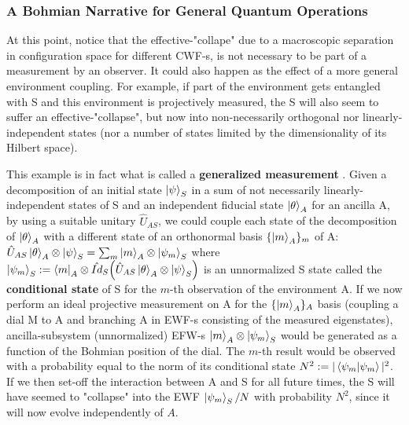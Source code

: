 \documentclass[11pt, a4paper]{article} %
\begin{document}
\subsubsection*{A Bohmian Narrative for General Quantum Operations}
At this point, notice that the effective-"collape" due to a macroscopic separation in configuration space for different CWF-s, is not necessary to be part of a measurement by an observer. It could also happen as the effect of a more general environment coupling. 
For example, if part of the environment gets entangled with S and this environment is projectively measured, the S will also seem to suffer an effective-"collapse", but now into non-necessarily orthogonal nor linearly-independent states (nor a number of states limited by the dimensionality of its Hilbert space). 

This example is in fact what is called a {\bf generalized measurement} \cite{Generalized, Durr}. Given a decomposition of an initial state $\ket{\psi}_S$ in a sum of not necessarily linearly-independent states of S and an independent fiducial state $\ket{\theta}_A$ for an ancilla A, by using a suitable unitary $\hat{U}_{AS}$, we could couple each state of the decomposition of $\ket{\theta}_A$ with a different state of an orthonormal basis $\{\ket{m}_A\}_m$ of A: $\hat{U}_{AS}\ket{\theta}_A\otimes\ket{\psi}_S=\sum_m \ket{m}_A\otimes \ket{\psi_m}_S$ where $\ket{\psi_m}_S:=\bra{m}_A\otimes\hat{Id}_S \qty(\hat{U}_{AS}\ket{\theta}_A\otimes\ket{\psi}_S)$ is an unnormalized S state called the {\bf conditional state} of S for the $m$-th observation of the environment A. If we now perform an ideal projective measurement on A for the $\{\ket{m}_A\}_A$ basis (coupling a dial M to A and branching A in EWF-s consisting of the measured eigenstates), ancilla-subsystem (unnormalized) EFW-s $\ket{m}_A\otimes \ket{\psi_m}_S$ would be generated as a function of the Bohmian position of the dial. The $m$-th result would be observed with a probability equal to the norm of its conditional state $N^2:=|\bra{\psi_m}\ket{\psi_m}|^2$. If we then set-off the interaction between A and S for all future times, the S will have seemed to "collapse" into the EWF $\ket{\psi_m}_S/N$ with probability $N^2$, since it will now evolve independently of $A$.
\end{document}
